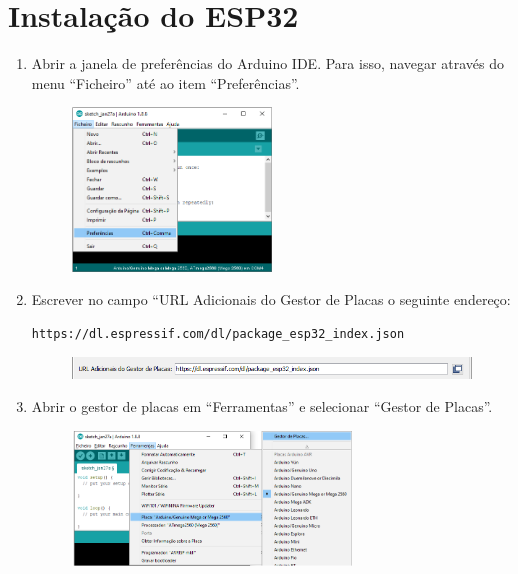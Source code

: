\documentclass{article}
\begin{document}
\section{Instalação do ESP32}
\begin{enumerate}
\item 
Abrir a janela de preferências do Arduino IDE. Para isso, navegar através do menu ``Ficheiro'' até ao item ``Preferências''.

\begin{figure}[htb!]
\centering
\includegraphics[width=0.5\textwidth]{Figuras/Fig1.png}
\label{fig:fig1}
\end{figure}
\item
Escrever no campo ``URL Adicionais do Gestor de Placas o seguinte endereço:
\begin{verbatim}
https://dl.espressif.com/dl/package_esp32_index.json
\end{verbatim}
\begin{figure}[htb!]
\centering
\includegraphics[width=1\textwidth]{Figuras/Fig2.png}
\label{fig:fig2}
\end{figure}
\item
Abrir o gestor de placas em ``Ferramentas'' e selecionar ``Gestor de Placas''.
\begin{figure}[htb!]
\centering
\includegraphics[width=0.7\textwidth]{Figuras/Fig3.png}
\label{fig:fig3}
\end{figure}


\end{enumerate}
\end{document}
